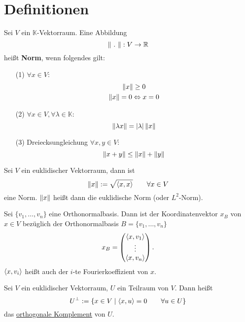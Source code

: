 \section{Definitionen}
\begin{definition}
    [Norm] Sei $V$ ein $\mathbb{K}$-Vektorraum. Eine Abbildung
    \[
        \norm{\ .\ }:V\to\mathbb{R}    
    \]
    heißt \textbf{Norm}, wenn folgendes gilt:
    \begin{enumerate}
        \item[(1)] $\forall x \in V :$
        \begin{gather*}
            \left\lVert x \right\rVert \geq 0\\
            \left\lVert x \right\rVert = 0 \Leftrightarrow x = 0
        \end{gather*}
        \item[(2)] $\forall x\in V,\forall \lambda \in \mathbb{K}:$
        \[
            \left\lVert \lambda x \right\rVert = \vert \lambda \vert\left\lVert x \right\rVert    
        \]
        \item[(3)] Dreiecksungleichung $\forall x,y\in V :$
        \[
            \left\lVert x + y \right\rVert \leq \left\lVert x \right\rVert + \left\lVert y \right\rVert    
        \]
    \end{enumerate}
\end{definition}
\begin{definition}
     Sei $V$ ein euklidischer Vektorraum, dann ist
    \[
        \left\lVert x \right\rVert:=\sqrt{\left\langle x,x \right\rangle}\qquad\forall x\in V    
    \]
    eine Norm. $\left\lVert x \right\rVert$ heißt dann die euklidische Norm (oder $L^2$-Norm).
\end{definition}
\begin{definition}
    [Koordinatenvektor] Sei $\{v_1,\dots,v_n\}$ eine Orthonormalbasis. Dann ist der
    Koordinatenvektor $x_B$ von $x\in V$ bezüglich der Orthonormalbasis 
    $B=\{v_1,\dots,v_n\}$
    \[
        x_B = \begin{pmatrix}
            \left\langle x,v_1 \right\rangle\\
            \vdots\\
            \left\langle x,v_n \right\rangle
        \end{pmatrix}
    .\] $\left\langle x,v_i \right\rangle$ heißt auch der $i$-te Fourierkoeffizient von $x$.
\end{definition}
\begin{definition}
     Sei $V$ ein euklidischer Vektorraum, $U$ ein Teilraum
    von $V$. Dann heißt
    \[
        U^\bot := \{x\in V\mid \left\langle x,u \right\rangle=0\qquad\forall u \in U\}    
    \]
    das \underline{orthogonale Komplement} von $U$.
\end{definition}